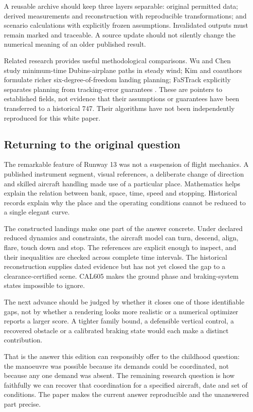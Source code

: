 A reusable archive should keep three layers separable: original permitted data; derived measurements and reconstruction with reproducible transformations; and scenario calculations with explicitly frozen assumptions. Invalidated outputs must remain marked and traceable. A source update should not silently change the numerical meaning of an older published result.

Related research provides useful methodological comparisons. Wu and Chen study minimum-time Dubins-airplane paths in steady wind; Kim and coauthors formulate richer six-degree-of-freedom landing planning; FaSTrack explicitly separates planning from tracking-error guarantees \cite{wu,kim,fastrack}. These are pointers to established fields, not evidence that their assumptions or guarantees have been transferred to a historical 747. Their algorithms have not been independently reproduced for this white paper.

\subsection*{Returning to the original question}
The remarkable feature of Runway 13 was not a suspension of flight mechanics. A published instrument segment, visual references, a deliberate change of direction and skilled aircraft handling made use of a particular place. Mathematics helps explain the relation between bank, space, time, speed and stopping. Historical records explain why the place and the operating conditions cannot be reduced to a single elegant curve.

The constructed landings make one part of the answer concrete. Under declared reduced dynamics and constraints, the aircraft model can turn, descend, align, flare, touch down and stop. The references are explicit enough to inspect, and their inequalities are checked across complete time intervals. The historical reconstruction supplies dated evidence but has not yet closed the gap to a clearance-certified scene. CAL605 makes the ground phase and braking-system states impossible to ignore.

The next advance should be judged by whether it closes one of those identifiable gaps, not by whether a rendering looks more realistic or a numerical optimizer reports a larger score. A tighter family bound, a defensible vertical control, a recovered obstacle or a calibrated braking state would each make a distinct contribution.

That is the answer this edition can responsibly offer to the childhood question: the manoeuvre was possible because its demands could be coordinated, not because any one demand was absent. The remaining research question is how faithfully we can recover that coordination for a specified aircraft, date and set of conditions. The paper makes the current answer reproducible and the unanswered part precise.

\clearpage
